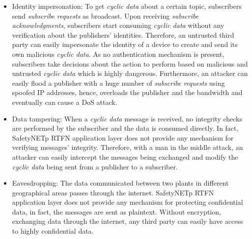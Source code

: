 \renewcommand{\labelitemi}{$\bullet$}
\begin{itemize}
\item Identity impersonation: To get \textit{cyclic data} about a certain topic, subscribers send \textit{subscribe requests} as broadcast.
Upon receiving \textit{subscribe acknowledgments}, subscribers start consuming \textit{cyclic data} without any verification about the publishers'
identities. Therefore, an untrusted third party can easily impersonate the identity of a device to create and send
its own malicious \textit{cyclic data}. As no authentication mechanism is present, subscribers take decisions about the action to perform
based on malicious and untrusted \textit{cyclic data} which is highly dangerous. Furthermore, an attacker can easily flood a publisher
with a huge number of \textit{subscribe requests} using spoofed IP addresses, hence, overloads the publisher and the bandwidth and eventually can
cause a DoS attack.\\


\item Data tampering: When a \textit{cyclic data} message is received, no integrity checks are performed by the subscriber
and the data is consumed directly. In fact, SafetyNETp RTFN application layer does not provide any mechanism for
verifying messages' integrity. Therefore, with a man in the middle attack, an attacker can easily intercept the messages
being exchanged and modify the \textit{cyclic data} being
sent from a publisher to a subscriber.\\

\item Eavesdropping: The data communicated between two plants in different geographical areas passes through the internet.
SafetyNETp RTFN application layer does not provide any mechanism for protecting confidential data, in fact,
the messages are sent as plaintext. Without encryption, exchanging data through the internet, any third party can
easily have access to highly confidential data.\\
\end{itemize}

